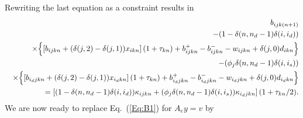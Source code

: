 \documentclass{report}[fleqn,12pt]
\begin{document}
Rewriting the last equation as a constraint results in
\begin{eqnarray}
	&&b_{ijk(n+1)} 
	  \nonumber  \\
	&& - (1 - \delta(n, n_d-1)\delta(i, i_d)) \nonumber\\
	&& \times \Bigl\{ \left[b_{ijkn} + (\delta(j, 2) - \delta(j, 1))x_{ikn}\right](1 + \tau_{kn}) + b^+_{ijkn} - b^-_{ijkn} - w_{ijkn} + \delta(j, 0)d_{ikn} \Bigr\}
	\nonumber \\
	&&- (\phi_j\delta(n, n_d-1)\delta(i, i_s)) \nonumber \\
	&& \times \Bigl\{ \left[b_{i_djkn} + (\delta(j, 2) - \delta(j, 1))x_{i_dkn}\right](1 + \tau_{kn}) + b^+_{i_djkn} - b^-_{i_djkn} - w_{i_djkn} + \delta(j, 0)d_{i_dkn} \Bigr\}
	\nonumber \\
	&&= \left[ (1 - \delta(n, n_d-1)\delta(i, i_d)) 
	\kappa_{ijkn} + (\phi_j\delta(n, n_d-1)\delta(i, i_s))
	\kappa_{i_djkn}\right](1 + \tau_{kn}/2). \nonumber  \\
\end{eqnarray}
We are now ready to replace Eq.~(\ref{Eq:B1}) for $A_ey = v$ by
\end{document}
